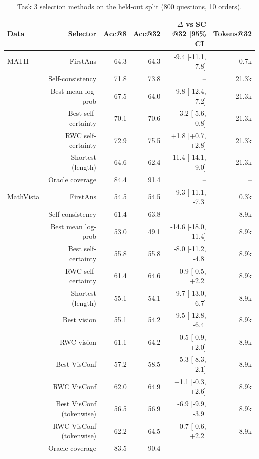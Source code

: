 \begin{table}[t]
\centering
\scriptsize
\begin{tabular}{lrrrrr}
\toprule
Data & Selector & Acc@8 & Acc@32 & $\Delta$ vs SC @32 [95\% CI] & Tokens@32 \\
\midrule
MATH & FirstAns & 64.3 & 64.3 & -9.4 [-11.1, -7.8] & 0.7k \\
 & Self-consistency & 71.8 & 73.8 & -- & 21.3k \\
 & Best mean log-prob & 67.5 & 64.0 & -9.8 [-12.4, -7.2] & 21.3k \\
 & Best self-certainty & 70.1 & 70.6 & -3.2 [-5.6, -0.8] & 21.3k \\
 & RWC self-certainty & 72.9 & 75.5 & +1.8 [+0.7, +2.8] & 21.3k \\
 & Shortest (length) & 64.6 & 62.4 & -11.4 [-14.1, -9.0] & 21.3k \\
 & Oracle coverage & 84.4 & 91.4 & -- & -- \\
\midrule
MathVista & FirstAns & 54.5 & 54.5 & -9.3 [-11.1, -7.3] & 0.3k \\
 & Self-consistency & 61.4 & 63.8 & -- & 8.9k \\
 & Best mean log-prob & 53.0 & 49.1 & -14.6 [-18.0, -11.4] & 8.9k \\
 & Best self-certainty & 55.8 & 55.8 & -8.0 [-11.2, -4.8] & 8.9k \\
 & RWC self-certainty & 61.4 & 64.6 & +0.9 [-0.5, +2.2] & 8.9k \\
 & Shortest (length) & 55.1 & 54.1 & -9.7 [-13.0, -6.7] & 8.9k \\
 & Best vision & 55.1 & 54.2 & -9.5 [-12.8, -6.4] & 8.9k \\
 & RWC vision & 61.1 & 64.2 & +0.5 [-0.9, +2.0] & 8.9k \\
 & Best VisConf & 57.2 & 58.5 & -5.3 [-8.3, -2.1] & 8.9k \\
 & RWC VisConf & 62.0 & 64.9 & +1.1 [-0.3, +2.6] & 8.9k \\
 & Best VisConf (tokenwise) & 56.5 & 56.9 & -6.9 [-9.9, -3.9] & 8.9k \\
 & RWC VisConf (tokenwise) & 62.2 & 64.5 & +0.7 [-0.6, +2.2] & 8.9k \\
 & Oracle coverage & 83.5 & 90.4 & -- & -- \\
\bottomrule
\end{tabular}
\caption{Task 3 selection methods on the held-out split (800 questions, 10 orders).}
\label{tab:t3-methods}
\end{table}

